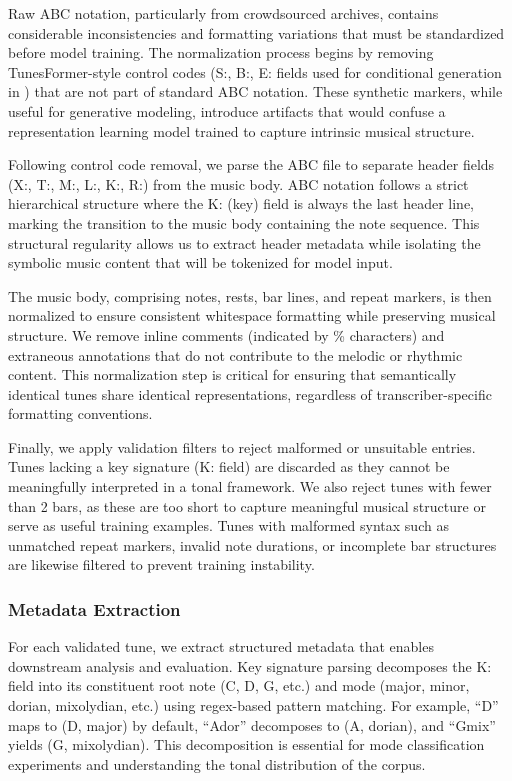 \documentclass[]{interact}
\theoremstyle{plain}
\theoremstyle{definition}
\theoremstyle{remark}
\begin{document}
Raw ABC notation, particularly from crowdsourced archives, contains considerable inconsistencies and formatting variations that must be standardized before model training. The normalization process begins by removing TunesFormer-style control codes (S:, B:, E: fields used for conditional generation in \citet{von2023tunesformer}) that are not part of standard ABC notation. These synthetic markers, while useful for generative modeling, introduce artifacts that would confuse a representation learning model trained to capture intrinsic musical structure.

Following control code removal, we parse the ABC file to separate header fields (X:, T:, M:, L:, K:, R:) from the music body. ABC notation follows a strict hierarchical structure where the K: (key) field is always the last header line, marking the transition to the music body containing the note sequence. This structural regularity allows us to extract header metadata while isolating the symbolic music content that will be tokenized for model input.

The music body, comprising notes, rests, bar lines, and repeat markers, is then normalized to ensure consistent whitespace formatting while preserving musical structure. We remove inline comments (indicated by \% characters) and extraneous annotations that do not contribute to the melodic or rhythmic content. This normalization step is critical for ensuring that semantically identical tunes share identical representations, regardless of transcriber-specific formatting conventions.

Finally, we apply validation filters to reject malformed or unsuitable entries. Tunes lacking a key signature (K: field) are discarded as they cannot be meaningfully interpreted in a tonal framework. We also reject tunes with fewer than 2 bars, as these are too short to capture meaningful musical structure or serve as useful training examples. Tunes with malformed syntax such as unmatched repeat markers, invalid note durations, or incomplete bar structures are likewise filtered to prevent training instability.

\subsubsection{Metadata Extraction}

For each validated tune, we extract structured metadata that enables downstream analysis and evaluation. Key signature parsing decomposes the K: field into its constituent root note (C, D, G, etc.) and mode (major, minor, dorian, mixolydian, etc.) using regex-based pattern matching. For example, ``D'' maps to (D, major) by default, ``Ador'' decomposes to (A, dorian), and ``Gmix'' yields (G, mixolydian). This decomposition is essential for mode classification experiments and understanding the tonal distribution of the corpus.
\end{document}
